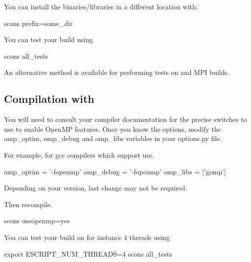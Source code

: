 You can install the binaries/libraries in a different location with:
\begin{shellCode}
 scons prefix=some_dir
\end{shellCode}

You can test your build using 
\begin{shellCode}
scons all_tests
\end{shellCode}
An alternative method is available for performing tests on \openmp and MPI builds.

\subsection{Compilation with \openmp}
You will need to consult your compiler documentation for the precise switches to use to enable OpenMP features.
Once you know the options, modify the omp_optim, omp_debug and omp_libs variables in your options.py file.

For example, for gcc compilers which support \openmp use.
\begin{shellCode}
omp_optim		= '-fopenmp'
omp_debug		= '-fopenmp'
omp_libs		= ['gomp']
\end{shellCode}
Depending on your version, last change may not be required.

Then recompile.
\begin{shellCode}
 scons useopenmp=yes
\end{shellCode}

You can test your build on for instance 4 threads using 
\begin{shellCode}
export ESCRIPT_NUM_THREADS=4
scons all_tests
\end{shellCode}

